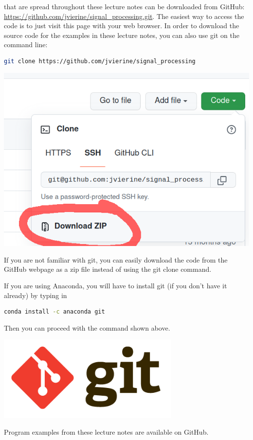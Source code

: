  that are spread throughout these lecture
notes can be downloaded from GitHub:
\url{https://github.com/jvierine/signal_processing.git}. The easiest
way to access the code is to just visit this page with your web
browser. In order to download the source code for the examples in
these lecture notes, you can also use git on the command line:
\begin{lstlisting}[language=sh,caption=Obtaining the source code for the programming examples with git,label=lst:download]
git clone https://github.com/jvierine/signal_processing
\end{lstlisting}
\begin{marginfigure}
  \includegraphics[width=\textwidth]{ch02/figures/downloadgit.png}
  \caption{If you are not familiar with git, you can easily download the code from the GitHub webpage as a zip file instead of using the git clone command.}
\end{marginfigure}
If you are using Anaconda, you will have to install git (if you don't
have it already) by typing in
\begin{lstlisting}[language=sh,caption=Obtaining the source code for the programming examples with git,label=lst:download]
  conda install -c anaconda git
\end{lstlisting}
Then you can proceed with the command shown above.

\begin{marginfigure}
  \includegraphics[width=0.68\textwidth]{ch02/figures/gitlogo.png}
  \caption{Program examples from these lecture notes are available on GitHub.}
\end{marginfigure}
